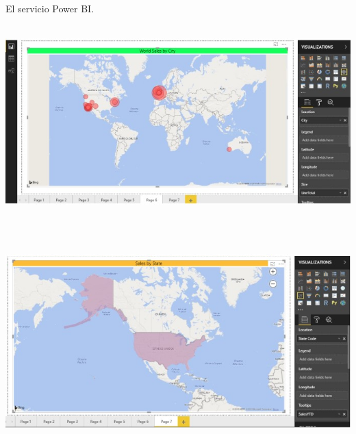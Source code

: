 \begin{flushleft}
\begin{itemize}
El servicio Power BI.\\
\textbf{ }\\
\begin{center}
	\includegraphics[width=15cm]{./Imagenes/image39} 
	\end{center}
\textbf{ }\\
\textbf{ }\\
\begin{center}
	\includegraphics[width=15cm]{./Imagenes/image40} 
	\end{center}
\textbf{ }\\


\end{itemize} 


\end{flushleft}